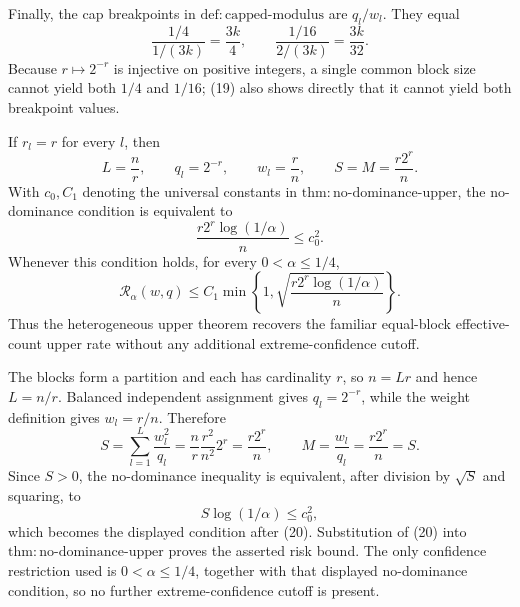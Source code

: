 Finally, the cap breakpoints in
\(\mathrm{def{:}capped\text{-}modulus}\) are \(q_l/w_l\).  They equal
\[
 \frac{1/4}{1/(3k)}=\frac{3k}{4},
 \qquad
 \frac{1/16}{2/(3k)}=\frac{3k}{32}.
\tag{19}
\]
Because \(r\mapsto2^{-r}\) is injective on positive integers, a
single common block size cannot yield both \(1/4\) and \(1/16\); (19)
also shows directly that it cannot yield both breakpoint values.

If \(r_l=r\) for every \(l\), then
\[
 L=\frac nr,\qquad q_l=2^{-r},\qquad w_l=\frac rn,
 \qquad S=M=\frac{r2^r}{n}.
\]
With \(c_0,C_1\) denoting the universal constants in
\(\mathrm{thm{:}no\text{-}dominance\text{-}upper}\), the no-dominance
condition is equivalent to
\[
 \frac{r2^r\log(1/\alpha)}{n}\le c_0^2.
\]
Whenever this condition holds, for every \(0<\alpha\le1/4\),
\[
 \mathcal R_\alpha(w,q)
 \le C_1\min\left\{1,
       \sqrt{\frac{r2^r\log(1/\alpha)}{n}}\right\}.
\]
Thus the heterogeneous upper theorem recovers the familiar
equal-block effective-count upper rate without any additional
extreme-confidence cutoff.

The blocks form a partition and each has cardinality \(r\), so
\(n=Lr\) and hence \(L=n/r\).  Balanced independent assignment gives
\(q_l=2^{-r}\), while the weight definition gives \(w_l=r/n\).
Therefore
\[
 S=\sum_{l=1}^L\frac{w_l^2}{q_l}
 =\frac nr\frac{r^2}{n^2}2^r
 =\frac{r2^r}{n},
 \qquad
 M=\frac{w_l}{q_l}=\frac{r2^r}{n}=S.
\tag{20}
\]
Since \(S>0\), the no-dominance inequality is equivalent, after
division by \(\sqrt S\) and squaring, to
\[
 S\log(1/\alpha)\le c_0^2,
\]
which becomes the displayed condition after (20).  Substitution of
(20) into \(\mathrm{thm{:}no\text{-}dominance\text{-}upper}\) proves
the asserted risk bound.  The only confidence restriction used is
\(0<\alpha\le1/4\), together with that displayed no-dominance
condition, so no further extreme-confidence cutoff is present.
